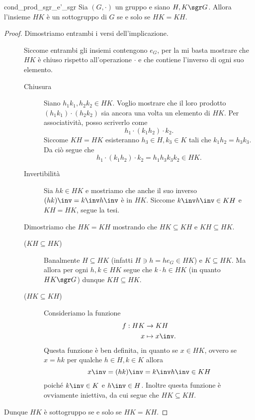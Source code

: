 \begin{proposition} 
    {cond_prod_sgr_e'_sgr}
    Sia $(G, \cdot)$ un gruppo e siano $H,K \sgr G$.
    Allora l'insieme $HK$ è un sottogruppo di $G$ se e solo se $HK = KH$.
\end{proposition}
\begin{proof}
    Dimostriamo entrambi i versi dell'implicazione.
    \begin{description}
        \item[\boximplby] Siccome entrambi gli insiemi contengono $e_G$, per la  mi basta mostrare che $HK$ è chiuso rispetto all'operazione $\cdot$ e che contiene l'inverso di ogni suo elemento. 
        \begin{description}
            \item[Chiusura] Siano $h_1k_1, h_2k_2 \in HK$. Voglio mostrare che il loro prodotto $(h_1k_1) \cdot (h_2k_2)$ sia ancora una volta un elemento di $HK$. Per associatività, posso scriverlo come \[
                h_1 \cdot (k_1h_2) \cdot k_2.    
            \] Siccome $KH = HK$ esisteranno $h_3 \in H, k_3 \in K$ tali che $k_1h_2 = h_3k_3$. Da ciò segue che \[
                h_1 \cdot (k_1h_2) \cdot k_2 = h_1h_3k_3k_2 \in HK.
            \]
            \item[Invertibilità] Sia $hk \in HK$ e mostriamo che anche il suo inverso $(hk)\inv = k\inv h\inv$ è in $HK$. Siccome $k\inv h\inv \in KH$ e $KH = HK$, segue la tesi.
        \end{description}
        \item[\boximpl ] Dimostriamo che $HK = KH$ mostrando che $HK \subseteq KH$ e $KH \subseteq HK$.
        \begin{description}
            \item[($KH \subseteq HK$)] Banalmente $H \subseteq HK$ (infatti $H \ni h = he_G \in HK$) e $K \subseteq HK$. Ma allora per ogni $h, k \in HK$ segue che $k \cdot h \in HK$ (in quanto $HK \sgr G$) dunque $KH \subseteq HK$.
            \item[($HK \subseteq KH$)] Consideriamo la funzione \begin{align*}
                f : HK &\to KH\\
                x &\mapsto x\inv.
            \end{align*} Questa funzione è ben definita, in quanto se $x \in HK$, ovvero se $x = hk$ per qualche $h \in H, k \in K$ allora \[
                x\inv = (hk)\inv = k\inv h\inv \in KH    
            \] poiché $k\inv \in K$ e $h\inv \in H$. Inoltre questa funzione è ovviamente iniettiva, da cui segue che $HK \subseteq KH$.
        \end{description}
    \end{description}
    Dunque $HK$ è sottogruppo se e solo se $HK = KH$.
\end{proof}